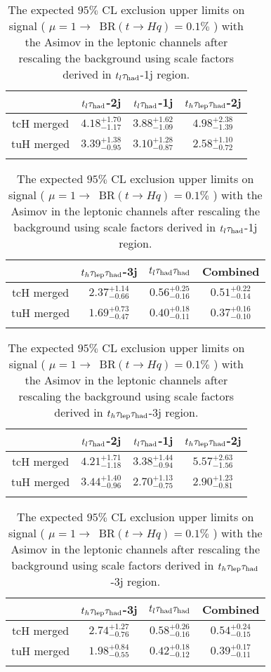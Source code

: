 \begin{table}
\centering
\begin{tabular}{cccc} \toprule\toprule
 & $t_l\tau_\text{had}$-2j & $t_l\tau_\text{had}$-1j & $t_h\tau_\text{lep}{}\tau_\text{had}$-2j\\\midrule
tcH merged & $4.18^{+1.70}_{-1.17}$ & $3.88^{+1.62}_{-1.09}$ & $4.98^{+2.38}_{-1.39}$\\
tuH merged & $3.39^{+1.38}_{-0.95}$ & $3.10^{+1.28}_{-0.87}$ & $2.58^{+1.10}_{-0.72}$\\
\bottomrule\bottomrule\\
\end{tabular}
\begin{tabular}{cccc} \toprule\toprule
 & $t_h\tau_\text{lep}{}\tau_\text{had}$-3j & $t_l\tau_\text{had}{}\tau_\text{had}$ & Combined\\\midrule
tcH merged & $2.37^{+1.14}_{-0.66}$ & $0.56^{+0.25}_{-0.16}$ & $0.51^{+0.22}_{-0.14}$\\
tuH merged & $1.69^{+0.73}_{-0.47}$ & $0.40^{+0.18}_{-0.11}$ & $0.37^{+0.16}_{-0.10}$\\
\bottomrule\bottomrule\\
\end{tabular}
\caption{The expected $95\%$ CL exclusion upper limits on signal ( $\mu=1\to$~BR$(t\to Hq)=0.1\%$ ) with the Asimov in the leptonic channels after rescaling the background using scale factors derived in $t_l\tau_\text{had}$-1j region.} 
\label{tab:tthML_rescaled_limit_fake_1j}
\end{table}



\begin{table}
\centering
\begin{tabular}{cccc} \toprule\toprule
 & $t_l\tau_\text{had}$-2j & $t_l\tau_\text{had}$-1j & $t_h\tau_\text{lep}{}\tau_\text{had}$-2j\\\midrule
tcH merged & $4.21^{+1.71}_{-1.18}$ & $3.38^{+1.44}_{-0.94}$ & $5.57^{+2.63}_{-1.56}$\\
tuH merged & $3.44^{+1.40}_{-0.96}$ & $2.70^{+1.13}_{-0.75}$ & $2.90^{+1.23}_{-0.81}$\\
\bottomrule\bottomrule\\
\end{tabular}
\begin{tabular}{cccc} \toprule\toprule
 & $t_h\tau_\text{lep}{}\tau_\text{had}$-3j & $t_l\tau_\text{had}{}\tau_\text{had}$ & Combined\\\midrule
tcH merged & $2.74^{+1.27}_{-0.76}$ & $0.58^{+0.26}_{-0.16}$ & $0.54^{+0.24}_{-0.15}$\\
tuH merged & $1.98^{+0.84}_{-0.55}$ & $0.42^{+0.18}_{-0.12}$ & $0.39^{+0.17}_{-0.11}$\\
\bottomrule\bottomrule\\
\end{tabular}
\caption{The expected $95\%$ CL exclusion upper limits on signal ( $\mu=1\to$~BR$(t\to Hq)=0.1\%$ ) with the Asimov in the leptonic channels after rescaling the background using scale factors derived in $t_h\tau_\text{lep}{}\tau_\text{had}$-3j region.} 
\label{tab:tthML_rescaled_limit_fake_3j}
\end{table}




